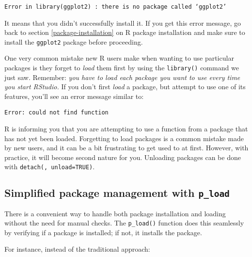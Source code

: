 \documentclass[
  12pt,
  oneside]{book}
\begin{document}
\begin{verbatim}
Error in library(ggplot2) : there is no package called ‘ggplot2’
\end{verbatim}

It means that you didn't successfully install it. If you get this error message, go back to section \ref{package-installation} on R package installation and make sure to install the \texttt{ggplot2} package before proceeding.

One very common mistake new R users make when wanting to use particular packages is they forget to \emph{load} them first by using the \texttt{library()} command we just saw. Remember: \emph{you have to load each package you want to use every time you start RStudio.} If you don't first \emph{load} a package, but attempt to use one of its features, you'll see an error message similar to:

\begin{verbatim}
Error: could not find function
\end{verbatim}

R is informing you that you are attempting to use a function from a package that has not yet been loaded. Forgetting to load packages is a common mistake made by new users, and it can be a bit frustrating to get used to at first. However, with practice, it will become second nature for you.
Unloading packages can be done with \texttt{detach(,\ unload=TRUE)}.

\hypertarget{package-management}{%
\subsection{\texorpdfstring{Simplified package management with \texttt{p\_load}}{Simplified package management with p\_load}}\label{package-management}}

There is a convenient way to handle both package installation and loading without the need for manual checks. The \texttt{p\_load()} function does this seamlessly by verifying if a package is installed; if not, it installs the package.

For instance, instead of the traditional approach:
\end{document}
